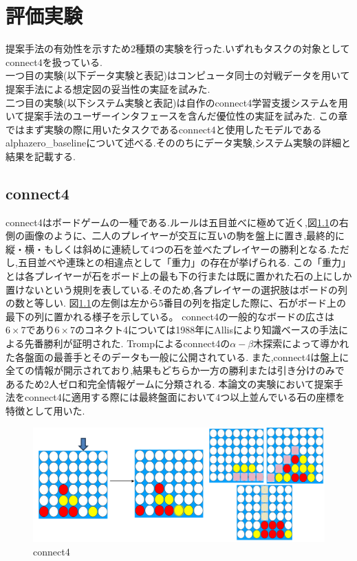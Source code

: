 \chapter{評価実験}
提案手法の有効性を示すため2種類の実験を行った.いずれもタスクの対象としてconnect4を扱っている.\\
一つ目の実験(以下データ実験と表記)はコンピュータ同士の対戦データを用いて提案手法による想定図の妥当性の実証を試みた.\\
二つ目の実験(以下システム実験と表記)は自作のconnect4学習支援システムを用いて提案手法のユーザーインタフェースを含んだ優位性の実証を試みた.
この章ではまず実験の際に用いたタスクであるconnect4と使用したモデルであるalphazero\_baselineについて述べる.そののちにデータ実験,システム実験の詳細と結果を記載する.
\section{connect4}
connect4\cite{connect4}はボードゲームの一種である.ルールは五目並べに極めて近く,図\ref{fig:connect4}の右側の画像のように、二人のプレイヤーが交互に互いの駒を盤上に置き,最終的に縦・横・もしくは斜めに連続して4つの石を並べたプレイヤーの勝利となる.ただし,五目並べや連珠との相違点として「重力」の存在が挙げられる.
この「重力」とは各プレイヤーが石をボード上の最も下の行または既に置かれた石の上にしか置けないという規則を表している.そのため,各プレイヤーの選択肢はボードの列の数と等しい.
図\ref{fig:connect4}の左側は左から5番目の列を指定した際に、石がボード上の最下の列に置かれる様子を示している。
connect4の一般的なボードの広さは$6\times7$であり$6\times7$のコネクト4については1988年にAllis\cite{allis}により知識ベースの手法による先番勝利が証明された.
Tromp\cite{data}によるconnect4の$\alpha-\beta$木探索によって導かれた各盤面の最善手とそのデータも一般に公開されている.
また,connect4は盤上に全ての情報が開示されており,結果もどちらか一方の勝利または引き分けのみであるため2人ゼロ和完全情報ゲームに分類される.
本論文の実験において提案手法をconnect4に適用する際には最終盤面において4つ以上並んでいる石の座標を特徴として用いた.
\begin{figure}[t]
	\centering
    \includegraphics[width=\linewidth]{./figure/connect4.png}
	\caption{connect4}
	\label{fig:connect4}
\end{figure}
